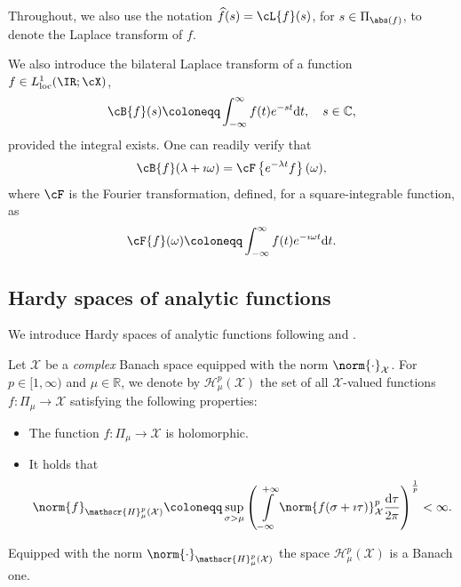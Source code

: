 Throughout, we also use the notation $\widehat{f}(s) = \cL\{f\}(s)$, for $s \in \Pi_{\abs(f)}$, to denote the Laplace transform of $f$.

We also introduce the  bilateral Laplace transform of a function $f\in L^1_{\text{loc}}(\IR;\cX)$,
\begin{align}\label{eq:bilateral_laplace}
    \cB\{f\}(s)
    \coloneqq
    \int_{-\infty}^\infty f(t) e^{-st} \text{d}t, \quad s\in\mathbb{C},
\end{align}
provided the integral exists. 
One can readily verify that
\begin{align}
	\cB\{f\}(\lambda+\imath\omega) 
    =
    \cF\left\{e^{-\lambda t}f\right\}(\omega),
\end{align}
where $\cF$ is the Fourier transformation, defined, for a square-integrable function, as
\begin{equation}
    \cF\{f\}(\omega)
    \coloneqq
    \int_{-\infty}^\infty f(t) e^{-\imath \omega t}\text{d}t.
\end{equation}

\subsection{Hardy spaces of analytic functions}

We introduce Hardy spaces of analytic functions 
following \cite[Chapter 4]{RR97} and \cite[Section 6.4]{hille1996functional}.


\begin{definition}
\label{def:hardy_spaces}
Let $\mathcal{X}$ be a {\it complex} Banach space equipped
with the norm $\norm{\cdot}_{\mathcal{X}}$.
For $p\in[1,\infty)$ and $\mu \in \mathbb{R}$, we denote by
$\mathscr{H}^{p}_\mu(\mathcal{X})$ the set of all $\mathcal{X}$-valued 
functions $f:\Pi_\mu \rightarrow \mathcal{X}$ satisfying
the following properties:
\begin{itemize}
    \item[(i)] 
    The function $f:\Pi_\mu \rightarrow \mathcal{X}$ is holomorphic.
    \item[(ii)]
    It holds that
\begin{align}
	\norm{f}_{\mathscr{H}^{p}_\mu(\mathcal{X})}
	\coloneqq
	\sup_{\sigma>\mu}
	\left(
		\,
		\int\limits_{-\infty}^{+\infty}
		\norm{
			f(\sigma+\imath \tau)
		}^p_\mathcal{X}
		\frac{
		\normalfont\text{d}
		\tau}{2\pi}
	\right)^{\frac{1}{p}}
	<
	\infty.
\end{align}
\end{itemize}
Equipped with the norm $\norm{\cdot}_{\mathscr{H}^{p}_\mu(\mathcal{X})}$
the space $\mathscr{H}^{p}_\mu(\mathcal{X})$ is a Banach one.
\end{definition}


